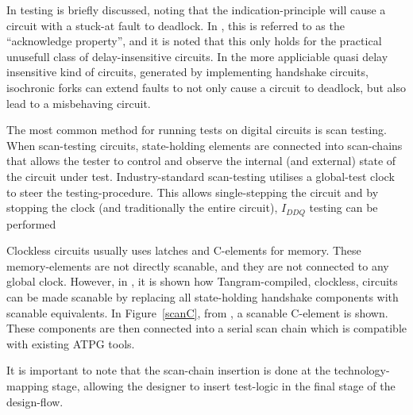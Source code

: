 In \cite[pp. 27-28]{sparso} testing is briefly discussed, noting that
the indication-principle will cause a circuit with a stuck-at fault to
deadlock. In \cite[pp. 26]{fullscan}, this is referred to as the
``acknowledge property'', and it is noted that this only holds for the
practical unusefull class of delay-insensitive circuits. In the more
appliciable quasi delay insensitive kind of circuits, generated by
implementing handshake circuits, isochronic forks can extend faults to
not only cause a circuit to deadlock, but also lead to a misbehaving
circuit.

The most common method for running tests on digital circuits is
scan testing. When scan-testing circuits, state-holding elements are
connected into scan-chains that allows the tester to control and
observe the internal (and external) state of the circuit under
test. Industry-standard scan-testing utilises a global-test clock to
steer the testing-procedure. This allows single-stepping the circuit
and by stopping the clock (and traditionally the entire circuit),
$I_{DDQ}$ testing can be performed

Clockless circuits usually uses latches and C-elements for
memory. These memory-elements are not directly scanable, and they are
not connected to any global clock. However, in \cite{fullscan}, it is
shown how Tangram-compiled, clockless, circuits can be made scanable
by replacing all state-holding handshake components with scanable
equivalents. In Figure~\ref{scanC}, from \cite{fullscan}, a scanable
C-element is shown. These components are then connected into a serial
scan chain which is compatible with existing ATPG tools.

It is important to note that the scan-chain insertion is done at the
technology-mapping stage, allowing the designer to insert test-logic
in the final stage of the design-flow.

